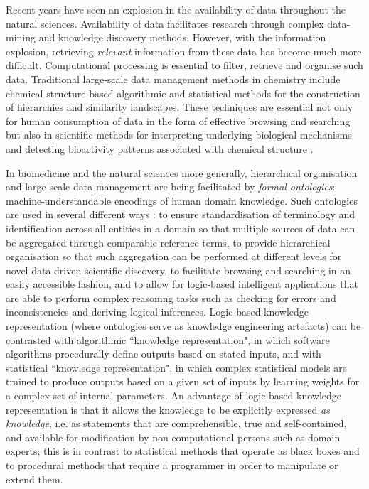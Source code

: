 \documentclass[10pt]{bmc_article}
\newenvironment{bmcformat}{\baselineskip20pt\sloppy\setboolean{publ}{false}}{\baselineskip20pt\sloppy}
\begin{document}
\begin{bmcformat}
Recent years have seen an explosion in the availability of data throughout the natural sciences. Availability of data facilitates research through complex data-mining and knowledge discovery methods. However, with the information explosion, retrieving \textit{relevant} information from these data has become much more difficult. Computational processing is essential to filter, retrieve and organise such data. Traditional large-scale data management methods in chemistry include chemical structure-based algorithmic and statistical methods for the construction of hierarchies and similarity landscapes. These techniques are essential not only for human consumption of data in the form of effective browsing and searching but also in scientific methods for interpreting underlying biological mechanisms and detecting bioactivity patterns associated with chemical structure \cite{cacm2011}. 

In biomedicine and the natural sciences more generally, hierarchical organisation and large-scale data management are being facilitated by \textit{formal ontologies}: machine-understandable encodings of human domain knowledge. Such ontologies are used in several different ways \cite{lambrix2004,courtotsysbio2011,Harland2011940}: to ensure standardisation of terminology and identification across all entities in a domain so that multiple sources of data can be aggregated through comparable reference terms, to provide hierarchical organisation so that such aggregation can be performed at different levels for novel data-driven scientific discovery, to facilitate browsing and searching in an easily accessible fashion, and to allow for logic-based intelligent applications that are able to perform complex reasoning tasks such as checking for errors and inconsistencies and deriving logical inferences. Logic-based knowledge representation (where ontologies serve as knowledge engineering artefacts) can be contrasted with algorithmic ``knowledge representation", in which software algorithms procedurally define outputs based on stated inputs, and with statistical ``knowledge representation", in which complex statistical models are trained to produce outputs based on a given set of inputs by learning weights for a complex set of internal parameters.  An advantage of logic-based knowledge representation is that it allows the knowledge to be explicitly expressed \textit{as knowledge}, i.e. as statements that are comprehensible, true and self-contained, and available for modification by non-computational persons such as domain experts; this is in contrast to statistical methods that operate as black boxes and to procedural methods that require a programmer in order to manipulate or extend them. 


\end{bmcformat}
\end{document}
